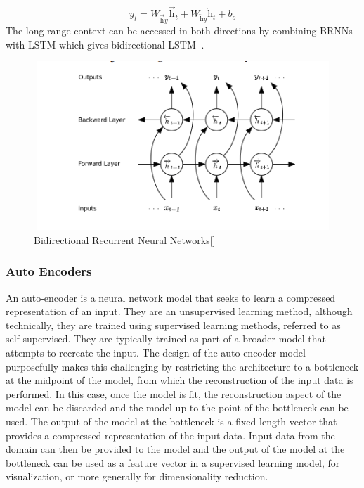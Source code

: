 \documentclass[12pt,a4paper]{article}
\begin{document}
\begin{equation}
    y_t = W_{\overrightarrow{\text{h}}y}\overrightarrow{\text{h}}_t + W_{\overleftarrow{\text{h}}y}\overleftarrow{\text{h}}_t +b_o
\end{equation}
The long range context can be accessed in both directions by combining BRNNs with LSTM which gives bidirectional LSTM[].

\begin{figure}[h]
    \centering
    \includegraphics[width=7in, height=2.5in]{brnn.png}
    \caption{Bidirectional Recurrent Neural Networks[]}
    \label{fig:brnn}
\end{figure}
\newpage

\subsubsection{Auto Encoders}
An auto-encoder is a neural network model that seeks to learn a compressed representation of an input.
They are an unsupervised learning method, although technically, they are trained using supervised learning methods, referred to as self-supervised. They are typically trained as part of a broader model that attempts to recreate the input.
The design of the auto-encoder model purposefully makes this challenging by restricting the architecture to a bottleneck at the midpoint of the model, from which the reconstruction of the input data is performed.
In this case, once the model is fit, the reconstruction aspect of the model can be discarded and the model up to the point of the bottleneck can be used. The output of the model at the bottleneck is a fixed length vector that provides a compressed representation of the input data.
Input data from the domain can then be provided to the model and the output of the model at the bottleneck can be used as a feature vector in a supervised learning model, for visualization, or more generally for dimensionality reduction.
\newpage
\end{document}
